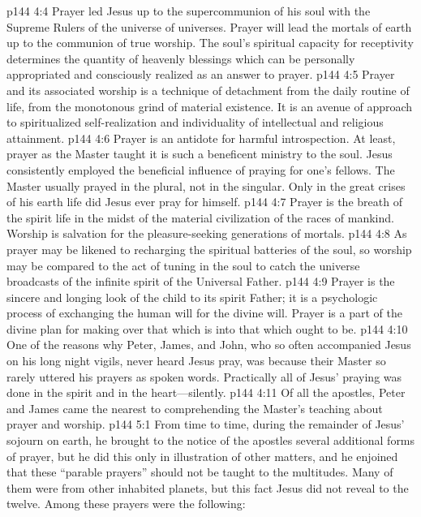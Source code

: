 \vs p144 4:4 Prayer led Jesus up to the supercommunion of his soul with the Supreme Rulers of the universe of universes. Prayer will lead the mortals of earth up to the communion of true worship. The soul’s spiritual capacity for receptivity determines the quantity of heavenly blessings which can be personally appropriated and consciously realized as an answer to prayer.
\vs p144 4:5 Prayer and its associated worship is a technique of detachment from the daily routine of life, from the monotonous grind of material existence. It is an avenue of approach to spiritualized self\hyp{}realization and individuality of intellectual and religious attainment.
\vs p144 4:6 Prayer is an antidote for harmful introspection. At least, prayer as the Master taught it is such a beneficent ministry to the soul. Jesus consistently employed the beneficial influence of praying for one’s fellows. The Master usually prayed in the plural, not in the singular. Only in the great crises of his earth life did Jesus ever pray for himself.
\vs p144 4:7 Prayer is the breath of the spirit life in the midst of the material civilization of the races of mankind. Worship is salvation for the pleasure\hyp{}seeking generations of mortals.
\vs p144 4:8 As prayer may be likened to recharging the spiritual batteries of the soul, so worship may be compared to the act of tuning in the soul to catch the universe broadcasts of the infinite spirit of the Universal Father.
\vs p144 4:9 Prayer is the sincere and longing look of the child to its spirit Father; it is a psychologic process of exchanging the human will for the divine will. Prayer is a part of the divine plan for making over that which is into that which ought to be.
\pc \vs p144 4:10 One of the reasons why Peter, James, and John, who so often accompanied Jesus on his long night vigils, never heard Jesus pray, was because their Master so rarely uttered his prayers as spoken words. Practically all of Jesus’ praying was done in the spirit and in the heart---silently.
\vs p144 4:11 Of all the apostles, Peter and James came the nearest to comprehending the Master’s teaching about prayer and worship.
\vs p144 5:1 From time to time, during the remainder of Jesus’ sojourn on earth, he brought to the notice of the apostles several additional forms of prayer, but he did this only in illustration of other matters, and he enjoined that these “parable prayers” should not be taught to the multitudes. Many of them were from other inhabited planets, but this fact Jesus did not reveal to the twelve. Among these prayers were the following:
